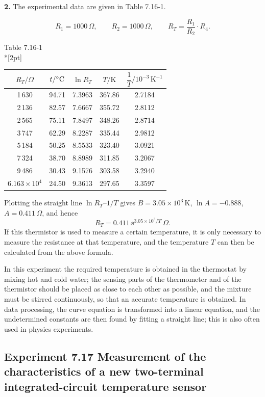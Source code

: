 \textbf{2.} The experimental data are given in Table 7.16-1.

\[
R_1=1000\,\Omega,\qquad R_2=1000\,\Omega,\qquad R_T=\frac{R_1}{R_2}\cdot R_4.
\]

\begin{center}
{\small Table 7.16-1}\\*[2pt]
\begin{tabular}{ccccc}
\toprule
$R_T/\Omega$ & $t/^{\circ}\mathrm{C}$ & $\ln R_T$ & $T/\mathrm{K}$ & $\dfrac{1}{T}/10^{-3}\,\mathrm{K^{-1}}$\\
\midrule
1\,630 & 94.71 & 7.3963 & 367.86 & 2.7184\\
2\,136 & 82.57 & 7.6667 & 355.72 & 2.8112\\
2\,565 & 75.11 & 7.8497 & 348.26 & 2.8714\\
3\,747 & 62.29 & 8.2287 & 335.44 & 2.9812\\
5\,184 & 50.25 & 8.5533 & 323.40 & 3.0921\\
7\,324 & 38.70 & 8.8989 & 311.85 & 3.2067\\
9\,486 & 30.43 & 9.1576 & 303.58 & 3.2940\\
$6.163\times10^4$ & 24.50 & 9.3613 & 297.65 & 3.3597\\
\bottomrule
\end{tabular}
\end{center}

Plotting the straight line $\ln R_T$--$1/T$ gives $B=3.05\times10^3\,\mathrm{K}$, $\ln A=-0.888$, $A=0.411\,\Omega$, and hence
\[
R_T=0.411\,\ee^{3.05\times10^3/T}\ \Omega.
\]
If this thermistor is used to measure a certain temperature, it is only necessary to measure the resistance at that temperature, and the temperature $T$ can then be calculated from the above formula.

\begin{commentary}
In this experiment the required temperature is obtained in the thermostat by mixing hot and cold water; the sensing parts of the thermometer and of the thermistor should be placed as close to each other as possible, and the mixture must be stirred continuously, so that an accurate temperature is obtained. In data processing, the curve equation is transformed into a linear equation, and the undetermined constants are then found by fitting a straight line; this is also often used in physics experiments.
\end{commentary}

\subsection*{Experiment 7.17 \quad Measurement of the characteristics of a new two-terminal integrated-circuit temperature sensor}

